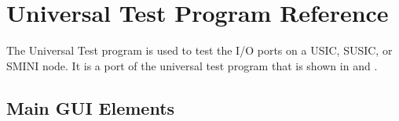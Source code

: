 \chapter{Universal Test Program Reference}
\label{chpt:univtest:Reference}

The Universal Test program is used to test the I/O ports on a USIC,
SUSIC, or SMINI node.  It is a port of the universal test program that
is shown in \cite{Chubb89} and \cite{Chubb03}.

\section{Main GUI Elements}

